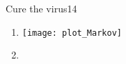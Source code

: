 \begin{questions}
\begin{question}{Cure the virus}{14}
\begin{answer}
\begin{enumerate}
\begin{equation}
\begin{pmatrix}
\end{pmatrix} = \begin{pmatrix}
0,42 & 0,974\\
0,58 & 0,026

\end{pmatrix} * \begin{pmatrix}
0,42 \\
0,58

\end{pmatrix} 
		\end{equation}
		
		\item 
		\texttt{[image: plot\_Markov]}\\
		\item 
		
		\end{enumerate}
		
	\end{answer}
		
	\end{question}

	
\end{questions}

